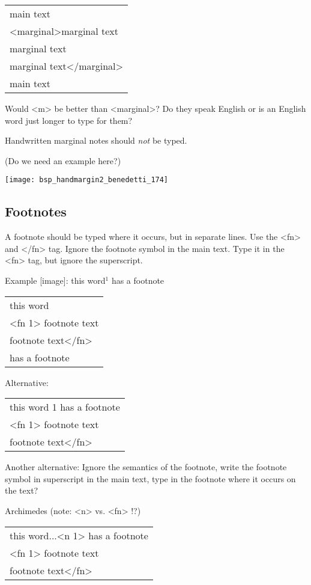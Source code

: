 \begin{tabular}{l}
main text \\
<marginal>marginal text\\
marginal text \\
marginal text</marginal> \\
main text \\
\end{tabular}

Would <m> be better than <marginal>? Do they speak English or is an English word just longer to type for them?

Handwritten marginal notes should \emph{not} be typed.

(Do we need an example here?)

\texttt{[image: bsp\_handmargin2\_benedetti\_174]} 

\subsection{Footnotes}

A footnote should be typed where it occurs, but in separate lines. Use the <fn> and </fn> tag. Ignore the footnote symbol in the main text. Type it in the <fn> tag, but ignore the superscript.

Example [image]: this word$^1$ has a footnote

\begin{tabular}{l}
this word \\
<fn 1> footnote text \\
footnote text</fn> \\
has a footnote \\
\end{tabular}

Alternative:

\begin{tabular}{l}
this word 1 has a footnote \\
<fn 1> footnote text \\
footnote text</fn> \\
\end{tabular}

Another alternative: Ignore the semantics of the footnote, write the footnote symbol in superscript in the main text, type in the footnote where it occurs on the text?

Archimedes (note: <n> vs. <fn> !?)

\begin{tabular}{l}
this word...<n 1> has a footnote \\
<fn 1> footnote text \\
footnote text</fn> \\
\end{tabular}

